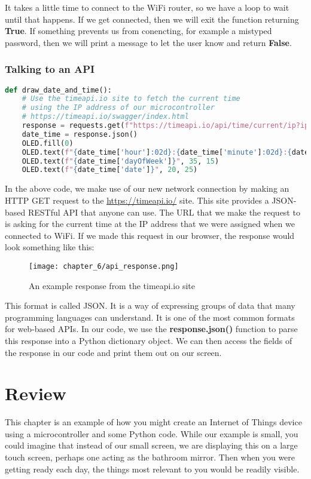 It takes a little time to connect to the WiFi router, so we have a loop to wait until that happens. If we
get connected, then we will exit the function returning \textbf{True}. If something prevents us from conencting,
for example a mistyped password, then we will print a message to let the user know and return \textbf{False}.

\subsubsection{Talking to an API}
\begin{lstlisting}[language=Python,caption=Making Web Requests]
def draw_date_and_time():
    # Use the timeapi.io site to fetch the current time
    # using the IP address of our microcontroller
    # https://timeapi.io/swagger/index.html
    response = requests.get(f"https://timeapi.io/api/time/current/ip?ipAddress={IP_ADDRESS}")
    date_time = response.json()
    OLED.fill(0)
    OLED.text(f"{date_time['hour']:02d}:{date_time['minute']:02d}:{date_time['seconds']:02d}", 30, 5)
    OLED.text(f"{date_time['dayOfWeek']}", 35, 15)
    OLED.text(f"{date_time['date']}", 20, 25)
\end{lstlisting}

In the above code, we make use of our new network connection by making an HTTP GET request to the \url{https://timeapi.io/}
site. This site provides a JSON-based RESTful API that anyone can use. The URL that we make the request to is
asking for the current time at the IP address that we were assigned when we connected to WiFi. If we made this request
in our browser, the response would look something like this:

\begin{figure}[H]
    \centering
    \texttt{[image: chapter\_6/api\_response.png]}
    \caption{An example response from the timeapi.io site}
\end{figure}

This format is called JSON. It is a way of expressing groups of data that many programming languages can
understand. It is one of the most common formats for web-based APIs. In our code, we use the \textbf{response.json()}
function to parse this response into a Python dictionary object. We can then access the fields of the response in
our code and print them out on our screen.

\section{Review}
This chapter is an example of how you might create an Internet of Things device using a microcontroller and
some Python code. While our example is small, you could imagine that instead of our small screen, we are
displaying this on a large touch screen, perhaps one acting as the bathroom mirror. Then when you were getting
ready each day, the things most relevant to you would be readily visible.

